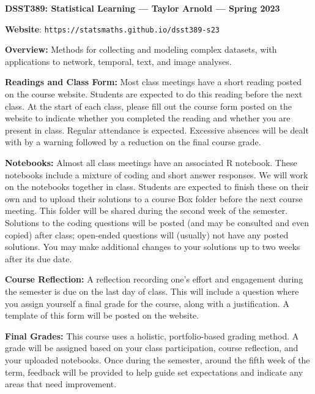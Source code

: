 \documentclass[11pt, a4paper]{article}
\begin{document}
\begin{center}
\textbf{DSST389: Statistical Learning --- Taylor Arnold --- Spring 2023}
\end{center}

\vspace{0.5cm}

\textbf{Website}: \texttt{https://statsmaths.github.io/dsst389-s23}

\bigskip

\textbf{Overview:}
Methods for collecting and modeling complex datasets, with applications
to network, temporal, text, and image analyses.

\bigskip

\textbf{Readings and Class Form:}
Most class meetings have a short reading posted on the course website.
Students are expected to do this reading before the next class. At the start
of each class, please fill out the course form posted on the website to indicate
whether you completed the reading and whether you are present in class. 
Regular attendance is expected. Excessive absences will be dealt with by a
warning followed by a reduction on the final course grade.

\bigskip

\textbf{Notebooks:}
Almost all class meetings have an associated R notebook.
These notebooks include a mixture of coding and short answer
responses. We will work on the notebooks together in class. Students are
expected to finish these on their own and to upload their solutions to a
course Box folder before the next course meeting. This folder will be shared
during the second week of the semester. Solutions to the coding questions
will be posted (and may be consulted and even copied) after class; open-ended
questions will (usually) not have any posted solutions. You may make
additional changes to your solutions up to two weeks after its due date.

\bigskip

\textbf{Course Reflection:}
A reflection recording one's effort and engagement during the semester
is due on the last day of class. This will include a question where you assign
yourself a final grade for the course, along with a justification.
A template of this form will be posted on the website.

\bigskip

\textbf{Final Grades:}
This course uses a holistic, portfolio-based grading method. A grade will
be assigned based on your class participation, course reflection, and your
uploaded notebooks. Once during the semester, around the fifth week of the
term, feedback will be provided to help guide set expectations and indicate
any areas that need improvement.
\end{document}
